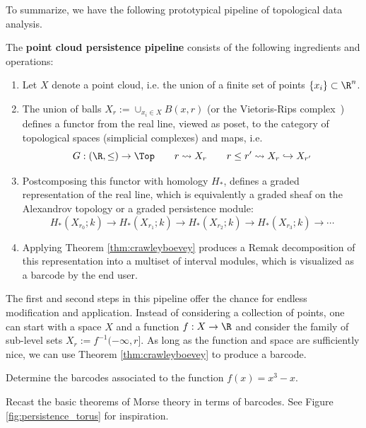 To summarize, we have the following prototypical pipeline of topological data analysis.
\begin{defn}\label{defn:point-cloud-persistence}
The \textbf{point cloud persistence pipeline} consists of the following ingredients and operations:
\begin{enumerate}
\item Let $X$ denote a point cloud, i.e. the union of a finite set of points $\{x_i\}\subset \R^n$.
\item The union of balls $X_r:=\cup_{x_i\in X} B(x,r)$ (or the Vietoris-Rips complex~\cite{ghrist-barcodes}) defines a functor from the real line, viewed as poset, to the category of topological spaces (simplicial complexes) and maps, i.e. 
\[
G:(\R,\leq)\to\Top \qquad r \rightsquigarrow X_r \qquad r\leq r' \rightsquigarrow X_r\hookrightarrow X_{r'}
\]
\item Postcomposing this functor with homology $H_{\ast}$, defines a graded representation of the real line, which is equivalently a graded sheaf on the Alexandrov topology or a graded persistence module:
\begin{equation*}
	H_{\ast}(X_{r_0};k) \to H_{\ast}(X_{r_1};k) \to H_{\ast}(X_{r_2};k) \to H_{\ast}(X_{r_3};k) \to \cdots 
\end{equation*}
\item Applying Theorem \ref{thm:crawleyboevey} produces a Remak decomposition of this representation into a multiset of interval modules, which is visualized as a barcode by the end user. 
\end{enumerate}
\end{defn}

The first and second steps in this pipeline offer the chance for endless modification and application. Instead of considering a collection of points, one can start with a space $X$ and a function $f:X\to\R$ and consider the family of sub-level sets $X_r:=f^{-1}(-\infty,r]$. As long as the function and space are sufficiently nice, we can use Theorem \ref{thm:crawleyboevey} to produce a barcode.

\begin{exr}
Determine the barcodes associated to the function $f(x)=x^3-x$.
\end{exr}

\begin{exr}
Recast the basic theorems of Morse theory in terms of barcodes. See Figure \ref{fig:persistence_torus} for inspiration.
\end{exr}

